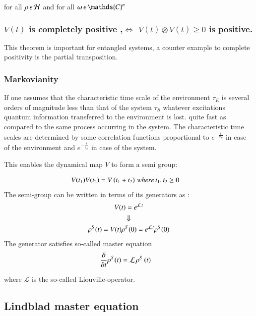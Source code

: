 for all $\rho\thinspace \epsilon \thinspace \mathcal{H}$ and for all $\omega \thinspace \epsilon \thinspace \mathds{C}^{n}$

\subsubsection{$V (t)$ is completely positive ,$\Leftrightarrow$ $V (t)\otimes V (t) \geq 0 $ is positive.} 
This theorem is important for entangled systems, a counter example to complete positivity is the partial transposition.
\par 
\subsubsection{Markovianity}
If one  assumes that the characteristic time scale of the environment $\tau_{E}$ is several orders of magnitude less than that of the system $\tau_{S}$ whatever excitations quantum information transferred to the environment is lost.
quite fast as compared to the same process occurring in the system. 
The characteristic time scales are determined by some correlation functions proportional to $e^{-\frac{t} {\tau_{E}}}$ in case of the environment and $e^{-\frac{t}{\tau_{S}}}$ in case of the system.


This enables  the dynamical map $V$ to form a semi group:

\begin{align}\label{aft33:61}
V(t_{1})V(t_{2}) &=V\left(t_{1}+t_{2}\right) \thinspace where\thinspace  t_{1},t_{2}\geq{0}
\end{align}
The semi-group can be written in terms of its generators as :
\begin{gather}
V(t) =e^{\mathcal{L}\thinspace{t}}\label{aft33:62}\\
\Downarrow\notag \\
\rho^{S}(t) = V(t)\rho^{S}(0)=e^{\mathcal{L}\thinspace {t}}\rho^{S}(0)\label{aft33:63}
\end{gather}
The generator satisfies  so-called master equation
\begin{align}\label{aft33:64}
\frac{\partial}{\partial{t}} \rho^{S}(t) &= \mathcal{L}\thinspace \rho^{S}\thinspace(t)
\end{align}

where $\mathcal{L}$ is the so-called Liouville-operator.


\subsection{Lindblad master equation}

